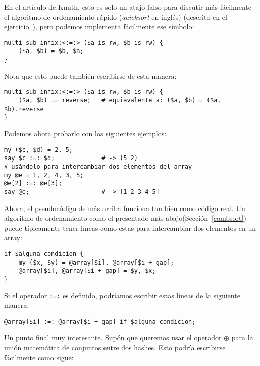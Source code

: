 En el artículo de Knuth, esto es solo un atajo falso para 
discutir más fácilmente el algoritmo de ordenamiento rápido
(\emph{quicksort} en inglés) (descrito en el ejercicio~),
pero podemos implementa fácilmente ese símbolo:

\begin{verbatim}
multi sub infix:<:=:> ($a is rw, $b is rw) {
    ($a, $b) = $b, $a;
}
\end{verbatim}

Nota que esto puede también escribirse de esta manera:

\begin{verbatim}
multi sub infix:<:=:> ($a is rw, $b is rw) {
    ($a, $b) .= reverse;   # equiavalente a: ($a, $b) = ($a, $b).reverse 
}
\end{verbatim}

Podemos ahora probarlo con los siguientes ejemplos:

\begin{verbatim}
my ($c, $d) = 2, 5;
say $c :=: $d;             # -> (5 2)
# usándolo para intercambiar dos elementos del array
my @e = 1, 2, 4, 3, 5;
@e[2] :=: @e[3];
say @e;                    # -> [1 2 3 4 5]
\end{verbatim}

Ahora, el pseudocódigo de más arriba funciona tan bien
como código real. Un algoritmo de ordenamiento como el presentado
más abajo(Sección~\ref{combsort}) puede típicamente tener líneas
como estas para intercambiar dos elementos en un array:

\begin{verbatim}
if $alguna-condicion {
    my ($x, $y) = @array[$i], @array[$i + gap];
    @array[$i], @array[$i + gap] = $y, $x;
}
\end{verbatim}

Si el operador \verb|:=:| es definido, podríamos escribir
estas líneas de la siguiente manera:

\begin{verbatim}
@array[$i] :=: @array[$i + gap] if $alguna-condicion;
\end{verbatim}

Un punto final muy interesante. Supón que queremos usar
el operador $\oplus$ para la unión matemática de conjuntos
entre dos hashes. Esto podría escribirse fácilmente 
como sigue:

